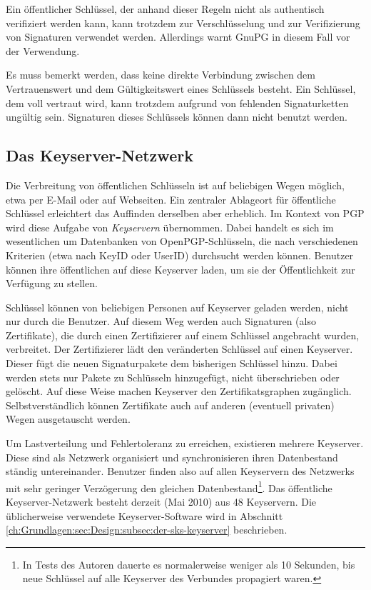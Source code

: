 Ein öffentlicher Schlüssel, der anhand dieser Regeln nicht als
authentisch verifiziert werden kann, kann trotzdem zur Verschlüsselung
und zur Verifizierung von Signaturen verwendet werden. Allerdings
warnt GnuPG in diesem Fall vor der Verwendung.

Es muss bemerkt werden, dass keine direkte Verbindung zwischen dem
Vertrauenswert und dem G\"ultigkeitswert eines Schl\"ussels
besteht. Ein Schl\"ussel, dem voll vertraut wird, kann trotzdem
aufgrund von fehlenden Signaturketten ung\"ultig sein. Signaturen
dieses Schl\"ussels k\"onnen dann nicht benutzt werden.

\subsection{Das Keyserver-Netzwerk}
\label{sec:das-keys-netzw}

Die Verbreitung von \"offentlichen Schl\"usseln ist auf beliebigen
Wegen m\"oglich, etwa per E-Mail oder auf Webseiten. Ein zentraler
Ablageort f\"ur \"offentliche Schl\"ussel erleichtert das Auffinden
derselben aber erheblich. Im Kontext von PGP wird diese Aufgabe von
\emph{Keyservern} \"ubernommen. Dabei handelt es sich im wesentlichen
um Datenbanken von OpenPGP-Schl\"usseln, die nach verschiedenen
Kriterien (etwa nach KeyID oder UserID) durchsucht werden
k\"onnen. Benutzer k\"onnen ihre \"offentlichen auf diese Keyserver
laden, um sie der \"Offentlichkeit zur Verf\"ugung zu stellen.

Schl\"ussel k\"onnen von beliebigen Personen auf Keyserver geladen
werden, nicht nur durch die Benutzer. Auf diesem Weg werden auch
Signaturen (also Zertifikate), die durch einen Zertifizierer auf einem
Schl\"ussel angebracht wurden, verbreitet. Der Zertifizierer l\"adt
den ver\"anderten Schl\"ussel auf einen Keyserver. Dieser f\"ugt die
neuen Signaturpakete dem bisherigen Schl\"ussel hinzu. Dabei werden
stets nur Pakete zu Schl\"usseln hinzugef\"ugt, nicht \"uberschrieben
oder gel\"oscht. Auf diese Weise machen Keyserver den
Zertifikatsgraphen zug\"anglich. Selbstverst\"andlich k\"onnen
Zertifikate auch auf anderen (eventuell privaten) Wegen ausgetauscht
werden.

Um Lastverteilung und Fehlertoleranz zu erreichen, existieren mehrere
Keyserver. Diese sind als Netzwerk organisiert und synchronisieren
ihren Datenbestand st\"andig untereinander. Benutzer finden also auf
allen Keyservern des Netzwerks mit sehr geringer Verz\"ogerung den
gleichen Datenbestand\footnote{In Tests des Autoren dauerte es
  normalerweise weniger als 10 Sekunden, bis neue Schl\"ussel auf alle
  Keyserver des Verbundes propagiert waren.}. Das \"offentliche
Keyserver-Netzwerk besteht derzeit (Mai 2010) aus 48
Keyservern\cite{SKS}. Die \"ublicherweise
verwendete Keyserver-Software wird in Abschnitt
\ref{ch:Grundlagen:sec:Design:subsec:der-sks-keyserver} beschrieben.

